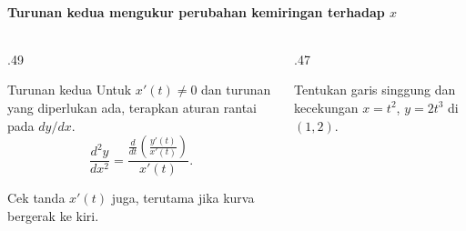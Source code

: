 \documentclass{../../kalkulus-ppt}
\begin{document}
\begin{frame}{\insertsection}
    \framesubtitle{Turunan kedua mengukur perubahan kemiringan terhadap $x$}
    \begin{columns}[c,onlytextwidth]
        \begin{column}{.49\textwidth}
            \begin{block}{Turunan kedua}
                Untuk $x'(t)\ne0$ dan turunan yang diperlukan ada,
                terapkan aturan rantai pada $dy/dx$.
                \[
                    \frac{d^2y}{dx^2}
                    =\frac{\displaystyle\frac{d}{dt}
                    \left(\frac{y'(t)}{x'(t)}\right)}{x'(t)}.
                \]
            \end{block}
            Cek tanda $x'(t)$ juga, terutama jika kurva bergerak ke kiri.
        \end{column}
        \begin{column}{.47\textwidth}
            \begin{contoh}
                Tentukan garis singgung dan kecekungan
                $x=t^2$, $y=2t^3$ di $(1,2)$.
            \end{contoh}
        \end{column}
    \end{columns}
\end{frame}
\end{document}
